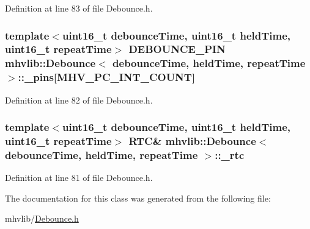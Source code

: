 Definition at line 83 of file Debounce.\-h.

\hypertarget{classmhvlib_1_1_debounce_a1c47f6a0b463c510752509abc41fc51a}{
\subsubsection[{\-\_\-pins}]{\setlength{\rightskip}{0pt plus 5cm}template$<$uint16\-\_\-t debounce\-Time, uint16\-\_\-t held\-Time, uint16\-\_\-t repeat\-Time$>$ {\bf D\-E\-B\-O\-U\-N\-C\-E\-\_\-\-P\-I\-N} {\bf mhvlib\-::\-Debounce}$<$ debounce\-Time, held\-Time, repeat\-Time $>$\-::\-\_\-pins\mbox{[}{\bf M\-H\-V\-\_\-\-P\-C\-\_\-\-I\-N\-T\-\_\-\-C\-O\-U\-N\-T}\mbox{]}\hspace{0.3cm}{\ttfamily [protected]}}}\label{classmhvlib_1_1_debounce_a1c47f6a0b463c510752509abc41fc51a}


Definition at line 82 of file Debounce.\-h.

\hypertarget{classmhvlib_1_1_debounce_a6fc47650f1f285bd100799b736bb7e08}{
\subsubsection[{\-\_\-rtc}]{\setlength{\rightskip}{0pt plus 5cm}template$<$uint16\-\_\-t debounce\-Time, uint16\-\_\-t held\-Time, uint16\-\_\-t repeat\-Time$>$ {\bf R\-T\-C}\& {\bf mhvlib\-::\-Debounce}$<$ debounce\-Time, held\-Time, repeat\-Time $>$\-::\-\_\-rtc\hspace{0.3cm}{\ttfamily [protected]}}}\label{classmhvlib_1_1_debounce_a6fc47650f1f285bd100799b736bb7e08}


Definition at line 81 of file Debounce.\-h.



The documentation for this class was generated from the following file\-:\begin{DoxyCompactItemize}
\item 
mhvlib/\hyperlink{_debounce_8h}{Debounce.\-h}\end{DoxyCompactItemize}
